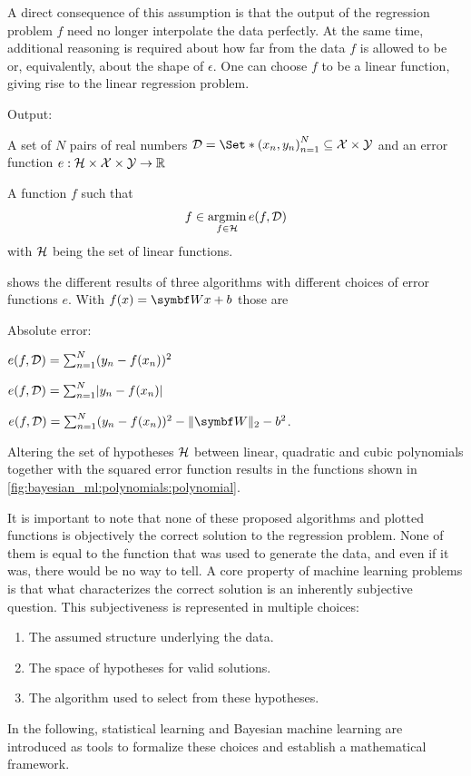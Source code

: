 A direct consequence of this assumption is that the output of the regression problem $f$ need no longer interpolate the data perfectly.
At the same time, additional reasoning is required about how far from the data $f$ is allowed to be or, equivalently, about the shape of $\epsilon$.
One can choose $f$ to be a linear function, giving rise to the linear regression problem.
\begin{problem}
\begin{labeling}{Output:}
    \item[Input:] A set of $N$ pairs of real numbers $\Dc = \Set*{\left(x_n, y_n\right)}_{n=1}^N \subseteq \Xc \times \Yc$ and an error function $e : \mathcal{H} \times \mathcal{X} \times \mathcal{Y} \to \mathbb{R}$
    \item[Output:] A function $f$ such that
    \begin{align}
        f \in \operatorname*{argmin}_{f \in \mathcal{H}} e(f, \mathcal{D})
    \end{align}
    with $\mathcal{H}$ being the set of linear functions.
\end{labeling}
\end{problem}
 shows the different results of three algorithms with different choices of error functions $e$.
With $f(x) = \mat{W}x + b$ those are
\begin{labeling}{Absolute error:}
    \item[Squared error:] $e(f, \mathcal{D}) = \sum_{n=1}^N (y_n - f(x_n))^2$
    \item[Absolute error:] $e(f, \Dc) = \sum_{n=1}^N \abs{y_n - f(x_n)}$
    \item[Ridge:] $e(f, \Dc) = \sum_{n=1}^N (y_n - f(x_n))^2 - \norm{\mat{W}}_2 - b^2$.
\end{labeling}
Altering the set of hypotheses $\mathcal{H}$ between linear, quadratic and cubic polynomials together with the squared error function results in the functions shown in \cref{fig:bayesian_ml:polynomials:polynomial}.

It is important to note that none of these proposed algorithms and plotted functions is objectively the correct solution to the regression problem.
None of them is equal to the function that was used to generate the data, and even if it was, there would be no way to tell.
A core property of machine learning problems is that what characterizes the correct solution is an inherently subjective question.
This subjectiveness is represented in multiple choices:
\begin{enumerate}
    \item The assumed structure underlying the data.
    \item The space of hypotheses for valid solutions.
    \item The algorithm used to select from these hypotheses.
\end{enumerate}
In the following, statistical learning and Bayesian machine learning are introduced as tools to formalize these choices and establish a mathematical framework.

